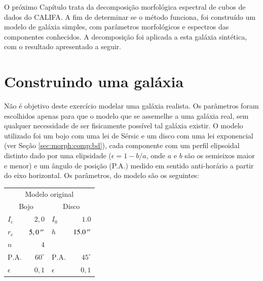 O próximo Capítulo trata da decomposição morfológica espectral de cubos de dados
do CALIFA. A fim de determinar se o método funciona, foi construído um modelo de
galáxia simples, com parâmetros morfológicos e espectros das componentes
conhecidos. A decomposição foi aplicada a esta galáxia sintética, com o
resultado apresentado a seguir.

\section{Construindo uma galáxia}

Não é objetivo deste exercício modelar uma galáxia realista. Os parâmetros foram
escolhidos apenas para que o modelo que se assemelhe a uma galáxia real, sem
qualquer necessidade de ser fisicamente possível tal galáxia existir. O modelo
utilizado foi um bojo com uma lei de Sérsic e um disco com uma lei exponencial
(ver Seção \ref{sec:morph:comp:bd}), cada componente com um perfil elipsoidal
distinto dado por uma elipsidade ($\epsilon = 1 - b/a$, onde $a$ e $b$ são os
semieixos maior e menor) e um ângulo de posição (P.A.) medido em sentido
anti-horário a partir do eixo horizontal. Os parâmetros, do modelo são os
seguintes:

\begin{tabular}{ l  r | l  r }
  \hline
  \multicolumn{4}{c}{Modelo original} \\
  \multicolumn{2}{c}{Bojo} & \multicolumn{2}{c}{Disco} \\
  \hline
  $I_e$ & $2,0$ & $I_0$ & $1.0$ \\
  $r_e$ & $5,0\,^{\prime\prime}$ & $h$ & $15.0\,^{\prime\prime}$ \\
  $n$ & $4$ & & \\
  $\mathrm{P.A.}$ & $60^\circ$ & $\mathrm{P.A.}$ & $45^\circ$ \\
  $\epsilon$ & $0,1$ & $\epsilon$ & $0,1$ \\
  \hline
\end{tabular}

